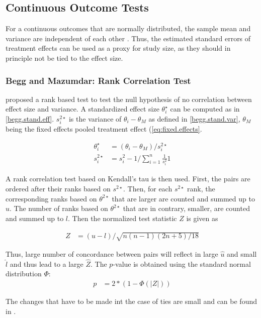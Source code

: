 \subsection{Continuous Outcome Tests}
For a continuous outcomes that are normally distributed, the sample mean and variance are independent of each other \cite[120]{meta.w.R}. Thus, the estimated standard errors of treatment effects can be used as a proxy for study size, as they should in principle not be tied to the effect size.

\subsubsection{Begg and Mazumdar: Rank Correlation Test} \label{sec:Begg}
\citet{begg.ties} proposed a rank based test to test the null hypothesis of no correlation between effect size and variance.
A standardized effect size $\theta_i^\star$ can be computed as in \ref{begg.stand.eff}. $s_i^{2\star}$ is the variance of $\theta_i - \theta_M$ as defined in \ref{begg.stand.var}, $\theta_M$ being the fixed effects pooled treatment effect (\ref{eq:fixed.effects}. 

\begin{align}
\theta_i^\star &= (\theta_i - \theta_M)/s_i^{2\star} \label{begg.stand.eff}  \\
s_i^{2\star} &= s_i^2 - 1/\sum_{i = 1}^n\frac{1}{s_i^2}1 \label{begg.stand.var} 
\end{align}

A rank correlation test based on Kendall's tau is then used. First, the pairs are ordered after their ranks based on $s^{2\star}$. Then, for each $s^{2\star}$ rank, the corresponding ranks based on $\theta^{2\star}$ that are larger are counted and summed up to $u$. The number of ranks based on $\theta^{2\star}$ that are in contrary, smaller, are counted and summed up to $l$. Then the normalized test statistic $Z$ is given as

\begin{align}
Z &= (u - l)/\sqrt{n(n-1)(2n + 5)/18} \nonumber
\end{align}

Thus, large number of concordance between pairs will reflect in large $\hat{u}$ and small $\hat{l}$ and thus lead to a large $\hat{Z}$. The $p$-value is obtained using the standard normal distribution $\Phi$:
\begin{align}
p &= 2*(1-\Phi(|Z|)) \nonumber
\end{align}

The changes that have to be made int the case of ties are small and can be found in \cite[410]{begg.ties}.


